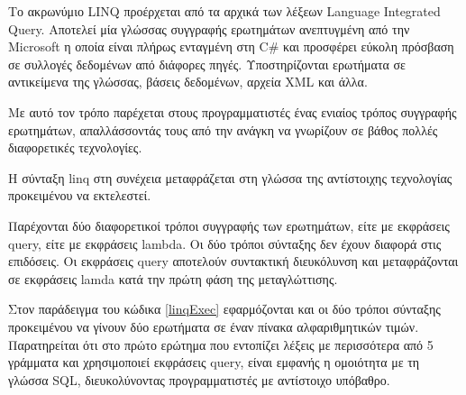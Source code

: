 Το ακρωνύμιο LINQ προέρχεται από τα αρχικά των λέξεων Language Integrated Query. Αποτελεί μία γλώσσας συγγραφής ερωτημάτων ανεπτυγμένη από την Microsoft η οποία είναι πλήρως ενταγμένη στη C\# και προσφέρει εύκολη πρόσβαση σε συλλογές δεδομένων από διάφορες πηγές. Υποστηρίζονται ερωτήματα σε αντικείμενα της γλώσσας, βάσεις δεδομένων, αρχεία XML και άλλα.

Με αυτό τον τρόπο παρέχεται στους προγραμματιστές ένας ενιαίος τρόπος συγγραφής ερωτημάτων, απαλλάσσοντάς τους από την ανάγκη να γνωρίζουν σε βάθος πολλές διαφορετικές τεχνολογίες.

Η σύνταξη linq στη συνέχεια μεταφράζεται στη γλώσσα της αντίστοιχης τεχνολογίας προκειμένου να εκτελεστεί.

Παρέχονται δύο διαφορετικοί τρόποι συγγραφής των ερωτημάτων, είτε με εκφράσεις  query, είτε με εκφράσεις lambda. Οι δύο τρόποι σύνταξης δεν έχουν διαφορά στις επιδόσεις. Οι εκφράσεις query αποτελούν συντακτική διευκόλυνση και μεταφράζονται σε εκφράσεις lamda κατά την πρώτη φάση της μεταγλώττισης.

Στον παράδειγμα του κώδικα \ref{linqExec} εφαρμόζονται και οι δύο τρόποι σύνταξης προκειμένου να γίνουν δύο ερωτήματα σε έναν πίνακα αλφαριθμητικών τιμών. Παρατηρείται ότι στο πρώτο ερώτημα που εντοπίζει λέξεις με περισσότερα από 5 γράμματα και χρησιμοποιεί εκφράσεις query, είναι εμφανής η ομοιότητα με τη γλώσσα SQL, διευκολύνοντας προγραμματιστές με αντίστοιχο υπόβαθρο.  


